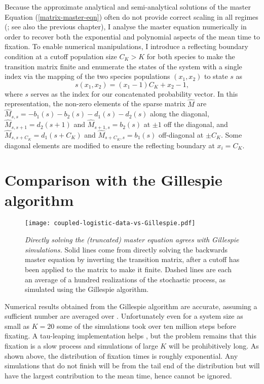 Because the approximate analytical and semi-analytical solutions of the master Equation (\ref{matrix-master-eqn}) often do not provide correct scaling in all regimes (\cite{Doering2005,Assaf2016,Badali2018}; see also the previous chapter), I analyse the master equation numerically in order to recover both the exponential and polynomial aspects of the mean time to fixation. 
To enable numerical manipulations, I introduce a reflecting boundary condition at a cutoff population size $C_K>K$ for both species to make the transition matrix finite \cite{Munsky2006,Cao2016} and enumerate the states of the system with a single index \cite{Munsky2006} via the mapping of the two species populations $(x_1,x_2)$ to state $s$ as
\begin{equation}
s(x_1,x_2) = (x_1-1)C_K+x_2-1,
\end{equation}
where $s$ serves as the index for our concatenated probability vector. In this representation, the non-zero elements of the sparse matrix $\hat{M}$ are $\hat{M}_{s,s}=-b_1(s)-b_2(s)-d_1(s)-d_2(s)$ along the diagonal, $\hat{M}_{s,s+1}=d_2(s+1)$ and $\hat{M}_{s+1,s}=b_2(s)$ at $\pm 1$ off the diagonal, and $\hat{M}_{s,s+C_K}=d_1(s+C_K)$ and $\hat{M}_{s+C_K,s}=b_1(s)$ off-diagonal at $\pm C_K$. 
Some diagonal elements are modified to ensure the reflecting boundary at $x_i=C_K$. 


\section{Comparison with the Gillespie algorithm}%
\begin{figure}[ht]
	\centering
	\texttt{[image: coupled-logistic-data-vs-Gillespie.pdf]}
	\caption{\emph{Directly solving the (truncated) master equation agrees with Gillespie simulations.} Solid lines come from directly solving the backwards master equation by inverting the transition matrix, after a cutoff has been applied to the matrix to make it finite. Dashed lines are each an average of a hundred realizations of the stochastic process, as simulated using the Gillespie algorithm. }
	\label{Gillespie}
\end{figure}

Numerical results obtained from the Gillespie algorithm are accurate, assuming a sufficient number are averaged over \cite{Gillespie1977}. 
Unfortunately even for a system size as small as $K=20$ some of the simulations took over ten million steps before fixating. 
A tau-leaping implementation helps \cite{Cao2006}, but the problem remains that this fixation is a slow process and simulations of large $K$ will be prohibitively long. 
As shown above, the distribution of fixation times is roughly exponential. 
Any simulations that do not finish will be from the tail end of the distribution but will have the largest contribution to the mean time, hence cannot be ignored. 

